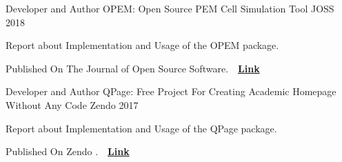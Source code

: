 \begin{cventries}
  \cventry
    {Developer and Author} %
    {OPEM: Open Source PEM Cell Simulation Tool} %
    {JOSS} %
    {2018} %
    {
      \begin{cvitems} %
        \item {Report about Implementation and Usage of the OPEM package.}
        \item {Published On The Journal of Open Source Software.~~\href{https://www.theoj.org/joss-papers/joss.00676/10.21105.joss.00676.pdf}{\textbf{Link}}}
      \end{cvitems}
    }

  \cventry
    {Developer and Author} %
    {QPage: Free Project For Creating Academic Homepage Without Any Code} %
    {Zendo} %
    {2017} %
    {
      \begin{cvitems} %
        \item {Report about Implementation and Usage of the QPage package.}
        \item {Published On Zendo .~~\href{http://doi.org/10.5281/zenodo.265544}{\textbf{Link}}}
      \end{cvitems}
    }

\end{cventries}
